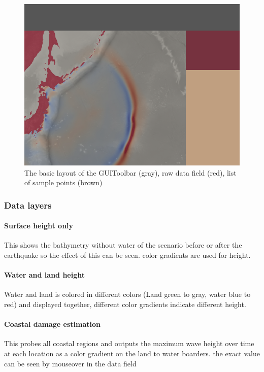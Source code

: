 \documentclass[paper=a4]{proc}
\begin{document}
			\begin{figure}
				\includegraphics[clip, width=\linewidth]{../../presentation4/img/GUI.png}
				\caption*{\centering The basic layout of the GUI\newline Toolbar (gray), raw data field (red), list of sample points (brown)}
			\end{figure}
			
			\subsubsection{Data layers}
			\paragraph{Surface height only}\hspace{0pt}\newline
			This shows the bathymetry without water of the scenario before or after the earthquake so the effect of this can be seen. color gradients are used for height.
			
			\paragraph{Water and land height}\hspace{0pt}\newline
			Water and land is colored in different colors (Land green to gray, water blue to red) and displayed together, different color gradients indicate different height.
			
			\paragraph{Coastal damage estimation}\hspace{0pt}\newline
		 This probes all coastal regions and outputs the maximum wave height over time at each location as a color gradient on the land to water boarders. the exact value can be seen by mouseover in the data field 
\end{document}
